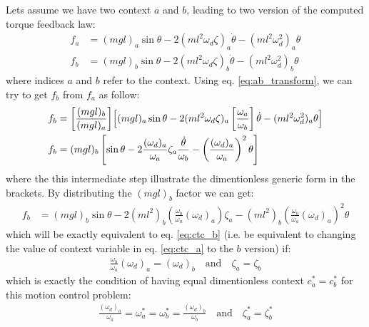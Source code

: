 Lets assume we have two context $a$ and $b$, leading to two version of the computed torque feedback law:
\begin{align}
f_a &= \left(mgl \right)_a \sin \theta - 2 (m l^2 \omega_d \zeta )_a \dot{\theta} - ( m l^2 \omega_d^2)_a \theta \\
f_b &= \left(mgl \right)_b \sin \theta - 2 (m l^2 \omega_d \zeta )_b \dot{\theta} - ( m l^2 \omega_d^2)_b \theta 
\end{align}
where indices $a$ and $b$ refer to the context. Using eq. \eqref{eq:ab_transform}, we can try to get $f_b$ from $f_a$ as follow:
\begin{align}
f_b &= \left[ \frac{(mgl)_b}{(mgl)_a} \right] \Bigr[  (mgl )_a \sin \theta - 2 (m l^2 \omega_d \zeta )_a \left[\frac{\omega_a}{\omega_b} \right] \dot{\theta}  - ( m l^2 \omega_d^2)_a \theta \Bigl] \label{eq:ctc_a} \\
f_b &= (mgl)_b \left[  \sin \theta - 2 \frac{(\omega_d )_a }{\omega_a } \zeta_a \frac{\dot{ \theta }}{\omega_b} - \left(\frac{(\omega_d )_a }{\omega_a }\right)^2 \theta \right]
\label{eq:ctc_b}
\end{align}
where the this intermediate step illustrate the dimentionless generic form in the brackets. By distributing the $(mgl)_b$ factor we can get:
\begin{align}
f_b &= (mgl)_b  \sin \theta - 2 (m l^2)_b 
\left( \frac{\omega_b}{\omega_a} (\omega_d )_a
\right) \zeta_a
- (m l^2)_b 
\left( 
\frac{\omega_b}{\omega_a} (\omega_d)_a 
\right)^2 
\theta
\end{align}
which will be exactly equivalent to eq. \eqref{eq:ctc_b} (i.e. be equivalent to changing the value of context variable in eq. \eqref{eq:ctc_a} to the $b$ version) if:
\begin{align}
\frac{\omega_b}{\omega_a} (\omega_d )_a = (\omega_d )_b 
\quad \text{and}  \quad \zeta_a = \zeta_b
\end{align}
which is exactly the condition of having equal dimentionless context $c_a^* = c_b^*$ for this motion control problem:
\begin{align}
\frac{(\omega_d )_a}{\omega_a}  = \omega^*_a =  \omega^*_b = \frac{(\omega_d )_b}{\omega_b} 
\quad \text{and}  \quad \zeta_a^* = \zeta_b^*
\end{align}


